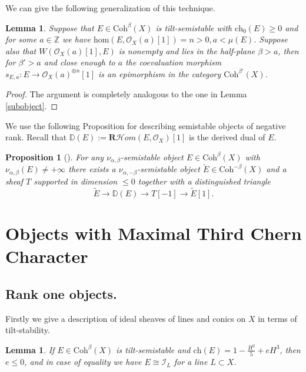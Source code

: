 \documentclass{amsart}
\newtheorem{proposition}[theorem]{Proposition}
\newtheorem{lemma}[theorem]{Lemma}
\begin{document}
	We can give the following generalization of this technique.
	
	\begin{lemma}\label{quotient}Suppose that $E\in\mathrm{Coh}^\beta(X)$ is tilt-semistable with $\mathrm{ch}_0(E)\ge 0$ and for some $a\in\mathbb Z$ we have $\mathrm{hom}(E,\mathcal O_X(a)[1])=n>0,a<\mu(E)$. Suppose also that $W(\mathcal O_X(a)[1],E)$ is nonempty and lies in the half-plane $\beta>a$, then for $\beta'>a$ and close enough to $a$ the coevaluation morphism $s_{E,a}:E\to\mathcal O_X(a)^{\oplus n}[1]$ is an epimorphism in the category $\mathrm{Coh}^{\beta'}(X)$.\end{lemma}
	
	\begin{proof} The argument is completely analogous to the one in Lemma \ref{subobject}.
	\end{proof}
	
	We use the following Proposition for describing semistable objects of negative rank. Recall that $\mathbb D(E):=\mathbf{R}\mathcal{H}om(E,\mathcal O_X)[1]$ is the derived dual of $E$.
	
	\begin{proposition}[{\cite[Proposition 5.1.3]{BMT}}]\label{duality} For any $\nu_{\alpha,\beta}$-semistable object $E\in\mathrm{Coh}^\beta(X)$ with $\nu_{\alpha,\beta}(E)\neq +\infty$ there exists a $\nu_{\alpha,-\beta}$-semistable object $\widetilde{E}\in\mathrm{Coh}^{-\beta}(X)$ and a sheaf $T$ supported in dimension $\le 0$ together with a distinguished triangle
		\begin{equation}\widetilde{E}\to\mathbb D(E)\to T[-1]\to\widetilde{E}[1].\end{equation}
	\end{proposition}
	
	\section{Objects with Maximal Third Chern Character}
	\label{bounds}
	\subsection{Rank one objects.}\label{r=1} Firstly we give a description of ideal sheaves of lines and conics on $X$ in terms of tilt-stability.
	
	\begin{lemma}\label{line}If $E\in\mathrm{Coh}^\beta(X)$ is tilt-semistable and $\mathrm{ch}(E)=1-\frac{H^2}{5}+eH^3$, then $e\le 0$, and in case of equality we have $E\cong\mathcal I_L$ for a line $L\subset X$.
	\end{lemma}
	
\end{document}
